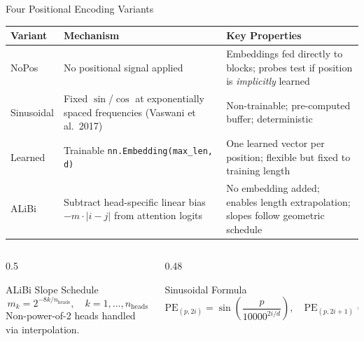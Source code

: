 \documentclass[aspectratio=169, 10pt]{beamer}
\begin{document}
\begin{frame}{Four Positional Encoding Variants}
  \begin{block}{}
    \small
    \centering
    \begin{tabular}{p{2.2cm}p{4.5cm}p{5.5cm}}
      \toprule
      \textbf{Variant} & \textbf{Mechanism} & \textbf{Key Properties} \\
      \midrule
      NoPos &
        No positional signal applied &
        Embeddings fed directly to blocks; probes test if position is \textit{implicitly} learned \\[0.5em]
      Sinusoidal &
        Fixed $\sin$/$\cos$ at exponentially spaced frequencies (Vaswani et al.\ 2017) &
        Non-trainable; pre-computed buffer; deterministic \\[0.5em]
      Learned &
        Trainable \texttt{nn.Embedding(max\_len, d)} &
        One learned vector per position; flexible but fixed to training length \\[0.5em]
      ALiBi &
        Subtract head-specific linear bias $-m \cdot |i - j|$ from attention logits &
        No embedding added; enables length extrapolation; slopes follow geometric schedule \\
      \bottomrule
    \end{tabular}
  \end{block}
  \vspace{0.4em}
  \begin{columns}
    \begin{column}{0.5\textwidth}
      \begin{block}{ALiBi Slope Schedule}
        \[
          m_k = 2^{-8k / n_{\text{heads}}}, \quad k = 1,\ldots,n_{\text{heads}}
        \]
        Non-power-of-2 heads handled via interpolation.
      \end{block}
    \end{column}
    \begin{column}{0.48\textwidth}
      \begin{block}{Sinusoidal Formula}
        \[
          \text{PE}_{(p,2i)} = \sin\!\left(\frac{p}{10000^{2i/d}}\right), \quad
          \text{PE}_{(p,2i+1)} = \cos\!\left(\frac{p}{10000^{2i/d}}\right)
        \]
      \end{block}
    \end{column}
  \end{columns}
\end{frame}

\end{document}
